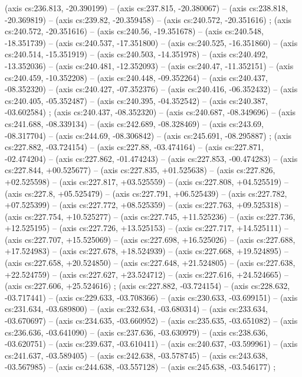     (axis cs:236.813,    -20.390199) --  (axis cs:237.815,    -20.380067) --  (axis cs:238.818,    -20.369819) --  (axis cs:239.82,    -20.359458) --  (axis cs:240.572,    -20.351616) ;
    (axis cs:240.572,    -20.351616) --  (axis cs:240.56,    -19.351678) --  (axis cs:240.548,    -18.351739) --  (axis cs:240.537,    -17.351800) --  (axis cs:240.525,    -16.351860) --  (axis cs:240.514,    -15.351919) --  (axis cs:240.503,    -14.351978) --  (axis cs:240.492,    -13.352036) --  (axis cs:240.481,    -12.352093) --  (axis cs:240.47,    -11.352151) --  (axis cs:240.459,    -10.352208) --  (axis cs:240.448,    -09.352264) --  (axis cs:240.437,    -08.352320) --  (axis cs:240.427,    -07.352376) --  (axis cs:240.416,    -06.352432) --  (axis cs:240.405,    -05.352487) --  (axis cs:240.395,    -04.352542) --  (axis cs:240.387,    -03.602584) ;
    (axis cs:240.437,    -08.352320) --  (axis cs:240.687,    -08.349696) --  (axis cs:241.688,    -08.339134) --  (axis cs:242.689,    -08.328469) --  (axis cs:243.69,    -08.317704) --  (axis cs:244.69,    -08.306842) --  (axis cs:245.691,    -08.295887) ;
    (axis cs:227.882,    -03.724154) --  (axis cs:227.88,    -03.474164) --  (axis cs:227.871,    -02.474204) --  (axis cs:227.862,    -01.474243) --  (axis cs:227.853,    -00.474283) --  (axis cs:227.844,    +00.525677) --  (axis cs:227.835,    +01.525638) --  (axis cs:227.826,    +02.525598) --  (axis cs:227.817,    +03.525559) --  (axis cs:227.808,    +04.525519) --  (axis cs:227.8,    +05.525479) --  (axis cs:227.791,    +06.525439) --  (axis cs:227.782,    +07.525399) --  (axis cs:227.772,    +08.525359) --  (axis cs:227.763,    +09.525318) --  (axis cs:227.754,    +10.525277) --  (axis cs:227.745,    +11.525236) --  (axis cs:227.736,    +12.525195) --  (axis cs:227.726,    +13.525153) --  (axis cs:227.717,    +14.525111) --  (axis cs:227.707,    +15.525069) --  (axis cs:227.698,    +16.525026) --  (axis cs:227.688,    +17.524983) --  (axis cs:227.678,    +18.524939) --  (axis cs:227.668,    +19.524895) --  (axis cs:227.658,    +20.524850) --  (axis cs:227.648,    +21.524805) --  (axis cs:227.638,    +22.524759) --  (axis cs:227.627,    +23.524712) --  (axis cs:227.616,    +24.524665) --  (axis cs:227.606,    +25.524616) ;
    (axis cs:227.882,    -03.724154) --  (axis cs:228.632,    -03.717441) --  (axis cs:229.633,    -03.708366) --  (axis cs:230.633,    -03.699151) --  (axis cs:231.634,    -03.689800) --  (axis cs:232.634,    -03.680314) --  (axis cs:233.634,    -03.670697) --  (axis cs:234.635,    -03.660952) --  (axis cs:235.635,    -03.651082) --  (axis cs:236.636,    -03.641090) --  (axis cs:237.636,    -03.630979) --  (axis cs:238.636,    -03.620751) --  (axis cs:239.637,    -03.610411) --  (axis cs:240.637,    -03.599961) --  (axis cs:241.637,    -03.589405) --  (axis cs:242.638,    -03.578745) --  (axis cs:243.638,    -03.567985) --  (axis cs:244.638,    -03.557128) --  (axis cs:245.638,    -03.546177) ;
